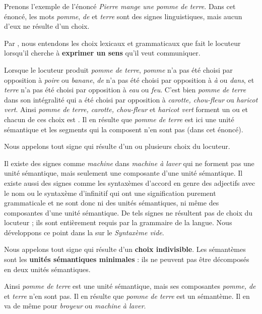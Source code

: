 Prenons l’exemple de l’énoncé \textit{Pierre mange une pomme de terre}. Dans cet énoncé, les mots \textit{pomme}, \textit{de} et \textit{terre} sont des signes linguistiques, mais aucun d’eux ne résulte d’un choix.

{Par , nous entendons les choix lexicaux et grammaticaux que fait le locuteur lorsqu’il cherche à \textbf{exprimer un sens} qu’il veut communiquer.}

Lorsque le locuteur produit \textit{pomme de terre}, \textit{pomme} n’a pas été choisi par opposition à \textit{poire} ou \textit{banane}, \textit{de} n’a pas été choisi par opposition à \textit{à} ou \textit{dans}, et \textit{terre} n’a pas été choisi par opposition à \textit{eau} ou \textit{feu}. C’est bien \textit{pomme de terre} dans son intégralité qui a été choisi par opposition à \textit{carotte, chou-fleur} ou \textit{haricot vert}. Ainsi \textit{pomme de terre, carotte, chou-fleur} et \textit{haricot vert} forment un  ou  et chacun de ces choix est . Il en résulte que \textit{pomme de terre} est ici une unité sémantique et les segments qui la composent n’en sont pas (dans cet énoncé).

{Nous appelons  tout signe qui résulte d’un ou plusieurs choix du locuteur.}

Il existe des signes comme \textit{machine} dans \textit{machine à laver} qui ne forment pas une unité sémantique, mais seulement une composante d’une unité sémantique. Il existe aussi des signes comme les syntaxèmes d’accord en genre des adjectifs avec le nom ou le syntaxème d’infinitif qui ont une signification purement grammaticale et ne sont donc ni des unités sémantiques, ni même des composantes d’une unité sémantique. De tels signes ne résultent pas de choix du locuteur ; ils sont entièrement requis par la grammaire de la langue. Nous développons ce point dans la  sur le \textit{Syntaxème vide}.

{Nous appelons  tout signe qui résulte d’un \textbf{choix indivisible}. Les sémantèmes sont les \textbf{unités sémantiques minimales} : ils ne peuvent pas être décomposés en deux unités sémantiques.}

Ainsi \textit{pomme de terre} est une unité sémantique, mais ses composantes \textit{pomme, de} et \textit{terre} n’en sont pas. Il en résulte que \textit{pomme de terre} est un sémantème. Il en va de même pour \textit{broyeur} ou \textit{machine à laver}.

